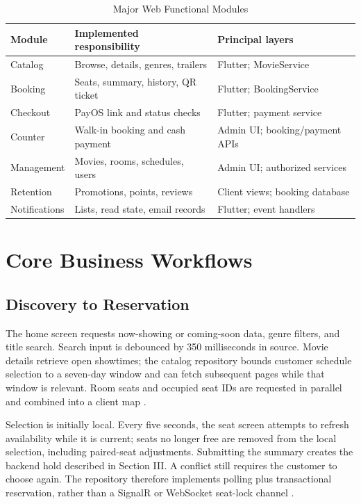\documentclass[conference]{IEEEtran}
\begin{document}
\begin{table}[t]
\caption{Major Web Functional Modules}\label{tab:modules}
\centering\footnotesize
\begin{tabularx}{\columnwidth}{@{}lYY@{}}\toprule
Module & Implemented responsibility & Principal layers\\\midrule
Catalog & Browse, details, genres, trailers & Flutter; MovieService\\
Booking & Seats, summary, history, QR ticket & Flutter; BookingService\\
Checkout & PayOS link and status checks & Flutter; payment service\\
Counter & Walk-in booking and cash payment & Admin UI; booking/payment APIs\\
Management & Movies, rooms, schedules, users & Admin UI; authorized services\\
Retention & Promotions, points, reviews & Client views; booking database\\
Notifications & Lists, read state, email records & Flutter; event handlers\\\bottomrule
\end{tabularx}
\end{table}

\section{Core Business Workflows}
\subsection{Discovery to Reservation}
The home screen requests now-showing or coming-soon data, genre filters, and
title search. Search input is debounced by 350 milliseconds in source.
Movie details retrieve open showtimes; the catalog repository bounds customer
schedule selection to a seven-day window and can fetch subsequent pages while
that window is relevant. Room seats and occupied seat IDs are requested in
parallel and combined into a client map \cite{client,webui}.

Selection is initially local. Every five seconds, the seat screen attempts to
refresh availability while it is current; seats no longer free are removed
from the local selection, including paired-seat adjustments. Submitting the
summary creates the backend hold described in Section III. A conflict still
requires the customer to choose again. The repository therefore implements
polling plus transactional reservation, rather than a SignalR or WebSocket
seat-lock channel \cite{client,booking}.
\end{document}
